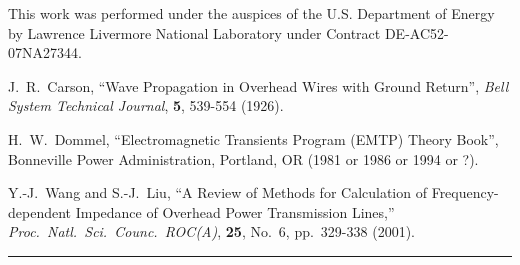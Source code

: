 \documentclass[12pt,fleqn]{article}
\begin{document}
This work was performed under the auspices of the U.S. Department of Energy by Lawrence Livermore National Laboratory under Contract DE-AC52-07NA27344.

\vskip5mm
\baselineskip=12pt
\begin{thebibliography}{9}

 J.~R.~Carson, ``Wave Propagation in Overhead Wires with Ground Return'', \emph{Bell System Technical Journal}, {\bf 5}, 539-554 (1926).

 H.~W.~Dommel, ``Electromagnetic Transients Program (EMTP) Theory Book'', Bonneville Power Administration, Portland, OR (1981 or 1986 or 1994 or ?).

 Y.-J.~Wang and S.-J.~Liu, ``A Review of Methods for Calculation of Frequency-dependent Impedance of Overhead Power Transmission Lines,'' \emph{Proc.~Natl.~Sci.~Counc.~ROC(A)}, {\bf 25}, No.~6, pp.~329-338 (2001).

\end{thebibliography}

\vskip5mm
\hrule
\vskip5mm
\parindent=0pt

\end{document}
